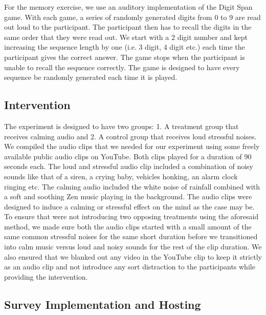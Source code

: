 \documentclass[journal,onecolumn, 12pt]{article}
\begin{document}
\noindent
For the memory exercise, we use an auditory implementation of the Digit Span game. With each game, a series of randomly generated digits from 0 to 9 are read out loud to the participant. The participant then has to recall the digits in the same order that they were read out. We start with a 2 digit number and kept increasing the sequence length by one (i.e. 3 digit, 4 digit etc.) each time the participant gives the correct answer. The game stops when the participant is unable to recall the sequence correctly. The game is designed to have every sequence be randomly generated each time it is played.

\subsection{Intervention}

The experiment is designed to have two groups: 1. A treatment group that receives calming audio and 2. A control group that receives loud stressful noises. We compiled the audio clips that we needed for our experiment using some freely available public audio clips on YouTube. Both clips played for a duration of 90 seconds each. The loud and stressful audio clip included a combination of noisy sounds like that of a siren, a crying baby, vehicles honking, an alarm clock ringing etc. The calming audio included the white noise of rainfall combined with a soft and soothing Zen music playing in the background. The audio clips were designed to induce a calming or stressful effect on the mind as the case may be. \\

\noindent
To ensure that were not introducing two opposing treatments using the aforesaid method, we made sure both the audio clips started with a small amount of the same common stressful noises for the same short duration before we transitioned into calm music versus loud and noisy sounds for the rest of the clip duration. We also ensured that we blanked out any video in the YouTube clip to keep it strictly as an audio clip and not introduce any sort distraction to the participants while providing the intervention.

\subsection{Survey Implementation and Hosting}
\end{document}
